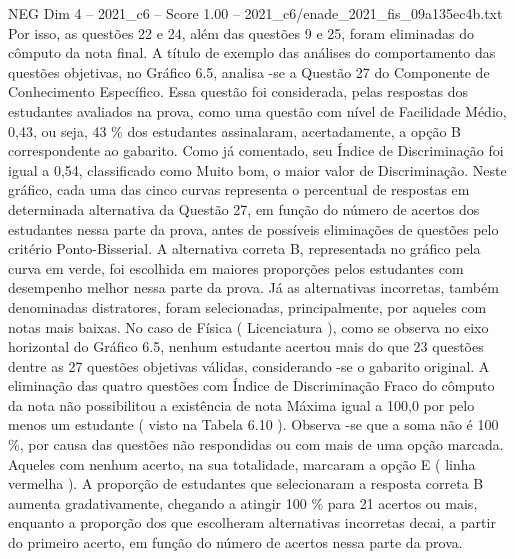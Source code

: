 \begin{textsample}{NEG Dim 4 – 2021\_c6 – Score 1.00 – 2021\_c6/enade\_2021\_fis\_09a135ec4b.txt}
Por isso, as questões 22 e 24, além das questões 9 e 25, foram eliminadas do cômputo da nota final.
A título de exemplo das análises do comportamento das questões objetivas, no Gráfico 6.5, analisa -se a Questão 27 do Componente de Conhecimento Específico.
Essa questão foi considerada, pelas respostas dos estudantes avaliados na prova, como uma questão com nível de Facilidade Médio, 0,43, ou seja, 43 \% dos estudantes assinalaram, acertadamente, a opção B correspondente ao gabarito.
Como já comentado, seu Índice de Discriminação foi igual a 0,54, classificado como Muito bom, o maior valor de Discriminação.
Neste gráfico, cada uma das cinco curvas representa o percentual de respostas em determinada alternativa da Questão 27, em função do número de acertos dos estudantes nessa parte da prova, antes de possíveis eliminações de questões pelo critério Ponto-Bisserial.
A alternativa correta B, representada no gráfico pela curva em verde, foi escolhida em maiores proporções pelos estudantes com desempenho melhor nessa parte da prova.
Já as alternativas incorretas, também denominadas distratores, foram selecionadas, principalmente, por aqueles com notas mais baixas.
No caso de Física ( Licenciatura ), como se observa no eixo horizontal do Gráfico 6.5, nenhum estudante acertou mais do que 23 questões dentre as 27 questões objetivas válidas, considerando -se o gabarito original.
A eliminação das quatro questões com Índice de Discriminação Fraco do cômputo da nota não possibilitou a existência de nota Máxima igual a 100,0 por pelo menos um estudante ( visto na Tabela 6.10 ).
Observa -se que a soma não é 100 \%, por causa das questões não respondidas ou com mais de uma opção marcada.
Aqueles com nenhum acerto, na sua totalidade, marcaram a opção E ( linha vermelha ).
A proporção de estudantes que selecionaram a resposta correta B aumenta gradativamente, chegando a atingir 100 \% para 21 acertos ou mais, enquanto a proporção dos que escolheram alternativas incorretas decai, a partir do primeiro acerto, em função do número de acertos nessa parte da prova.

\end{textsample}
